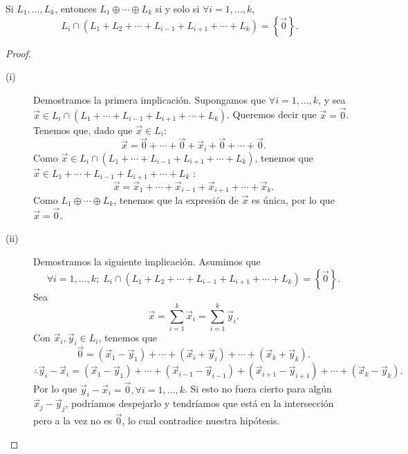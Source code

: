 \begin{fprop}[]
\normalfont Si $\displaystyle L_{1}, \ldots, L_{k} $, entonces $\displaystyle L_{1} \oplus \cdots \oplus L_{k} $ si y solo si $\displaystyle \forall i = 1, \ldots, k $, 
\[L_{i} \cap \left(L_{1} + L_{2} + \cdots + L_{i-1} + L_{i+1} + \cdots + L_{k}\right) = \left\{ \vec{0}\right\}  .\]
\end{fprop}

\begin{proof}
\begin{description}
\item[(i)] Demostramos la primera implicación. Supongamos que $\displaystyle \forall i = 1, \ldots, k $, y sea $\displaystyle \vec{x} \in L_{i} \cap \left(L_{1} + \cdots + L_{i-1} + L_{i+1} + \cdots + L_{k}\right) $. Queremos decir que $\displaystyle \vec{x} = \vec{0} $. Tenemos que, dado que $\displaystyle \vec{x}\in L_{i} $:
	\[\vec{x} = \vec{0} + \cdots + \vec{0} + \vec{x}_{i} + \vec{0} + \cdots + \vec{0} .\]
Como $\displaystyle \vec{x} \in L_{i} \cap \left(L_{1} + \cdots + L_{i-1} + L_{i+1} + \cdots + L_{k}\right) $, tenemos que $\displaystyle \vec{x}\in L_{1} + \cdots + L_{i-1}+L_{i+1}+\cdots + L_{k} $ :
\[\vec{x} = \vec{x}_{1} + \cdots + \vec{x}_{i-1} + \vec{x}_{i+1} + \cdots + \vec{x}_{k} .\]
Como $\displaystyle L_{1} \oplus \cdots \oplus L_{k} $, tenemos que la expresión de $\displaystyle \vec{x} $ es única, por lo que $\displaystyle \vec{x}=\vec{0} $.
\item[(ii)] Demostramos la siguiente implicación. Asumimos que 
	\[\displaystyle \forall i = 1, \ldots, k; \; L_{i} \cap \left(L_{1} + L_{2} + \cdots + L_{i-1} + L_{i+1} +\cdots + L_{k}\right) = \left\{ \vec{0}\right\}.\] 
Sea 
	\[\vec{x} = \sum^{k}_{i=1}\vec{x}_{i} = \sum^{k}_{i=1}\vec{y}_{i} .\]
Con $\displaystyle \vec{x}_{i}, \vec{y}_{i} \in L_{i} $, tenemos que 
\[\vec{0} = \left(\vec{x}_{1}-\vec{y}_{1}\right) + \cdots + \left(\vec{x}_{i} + \vec{y}_{i}\right) + \cdots + (\vec{x}_{k}+\vec{y}_{k}) .\]
\[\therefore \vec{y}_{i}-\vec{x}_{i} = \left(\vec{x}_{1} - \vec{y}_{1}\right) + \cdots + \left(\vec{x}_{i-1}-\vec{y}_{i-1}\right) + \left(\vec{x}_{i+1} - \vec{y}_{i+1}\right) + \cdots + \left(\vec{x}_{k} - \vec{y}_{k}\right) .\]
Por lo que $\displaystyle \vec{y}_{i} - \vec{x}_{i} = \vec{0}, \forall i = 1, \ldots, k $. Si esto no fuera cierto para algún $\displaystyle \vec{x}_{j}- \vec{y}_{j} $, podríamos despejarlo y tendríamos que está en la intersección pero a la vez no es $\displaystyle \vec{0} $, lo cual contradice nuestra hipótesis.
\end{description}
\end{proof}

